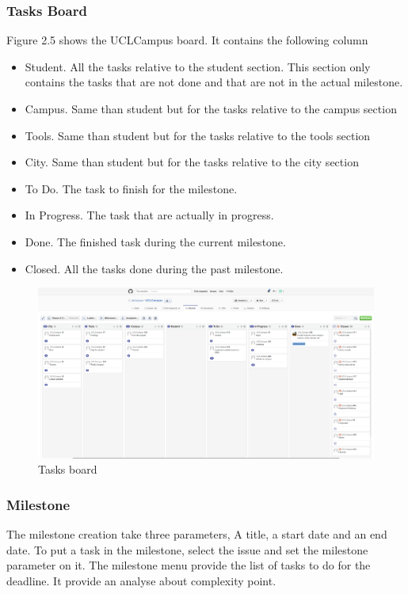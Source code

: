 \documentclass{eplmastersthesis}
\begin{document}
\subsubsection{Tasks Board}
Figure 2.5 shows the UCLCampus board. It contains the following column
\begin{itemize}
\item Student. All the tasks relative to the student section. This section only contains the tasks that are not done and that are not in the actual milestone.
\item Campus. Same than student but for the tasks relative to the campus section
\item Tools. Same than student but for the tasks relative to the tools section
\item City. Same than student but for the tasks relative to the city section
\item To Do. The task to finish for the milestone.
\item In Progress. The task that are actually in progress.
\item Done. The finished task during the current milestone.
\item Closed. All the tasks done during the past milestone.
\end{itemize}

\begin{figure}
\centering
\includegraphics[scale = 0.5, angle = 90]{Images/dashboard.png}
\caption{Tasks board}
\end{figure}

\subsubsection{Milestone}

The milestone creation take three parameters, A title, a start date and an end date. To put a task in the milestone, select the issue and set the milestone parameter on it. The milestone menu provide the list of tasks to do for the deadline. It provide an analyse about complexity point.
\end{document}
